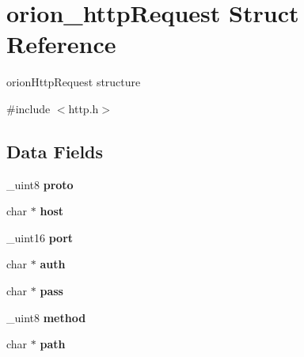 \hypertarget{structorion__httpRequest}{
\section{orion\_\-httpRequest Struct Reference}
\label{structorion__httpRequest}
}


orionHttpRequest structure  




{\ttfamily \#include $<$http.h$>$}

\subsection*{Data Fields}
\begin{DoxyCompactItemize}
\item 
\hypertarget{structorion__httpRequest_a64bfaa516d428c86822d7f699a4b3fbd}{
\_\-uint8 {\bfseries proto}}
\label{structorion__httpRequest_a64bfaa516d428c86822d7f699a4b3fbd}

\item 
\hypertarget{structorion__httpRequest_ab899e4a0d9502a87d55dd2fc7787967f}{
char $\ast$ {\bfseries host}}
\label{structorion__httpRequest_ab899e4a0d9502a87d55dd2fc7787967f}

\item 
\hypertarget{structorion__httpRequest_aacfa6b224771298d4f9aa307e75cdae9}{
\_\-uint16 {\bfseries port}}
\label{structorion__httpRequest_aacfa6b224771298d4f9aa307e75cdae9}

\item 
\hypertarget{structorion__httpRequest_a31986493800c21c55e4941602753ca2c}{
char $\ast$ {\bfseries auth}}
\label{structorion__httpRequest_a31986493800c21c55e4941602753ca2c}

\item 
\hypertarget{structorion__httpRequest_a43a5d0c6c3a1235da80fa9336bf649af}{
char $\ast$ {\bfseries pass}}
\label{structorion__httpRequest_a43a5d0c6c3a1235da80fa9336bf649af}

\item 
\hypertarget{structorion__httpRequest_a691ee7358c2c7044f6afc00f839537a0}{
\_\-uint8 {\bfseries method}}
\label{structorion__httpRequest_a691ee7358c2c7044f6afc00f839537a0}

\item 
\hypertarget{structorion__httpRequest_ae7e83c1e229725ede948c04bd6716644}{
char $\ast$ {\bfseries path}}
\label{structorion__httpRequest_ae7e83c1e229725ede948c04bd6716644}


\end{DoxyCompactItemize}
